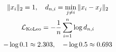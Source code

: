 \documentclass[border=7pt]{standalone}
\begin{document}
\color{ink}
$\displaystyle \begin{gathered}
\|x_i\|_2=1,\quad d_{n,i}=\min_{j\ne i}\|x_i-x_j\|_2\\
\mathcal L_{\rm KoLeo}=-\frac1n\sum_{i=1}^{n}\log d_{n,i}\\
-\log0.1\approx2.303,\quad-\log0.5\approx0.693
\end{gathered}$
\end{document}
